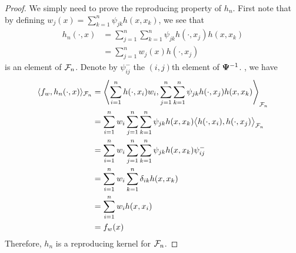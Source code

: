 \begin{proof}
  We simply need to prove the reproducing property of $h_n$.
  First note that by defining $w_j(x) = \sum_{k=1}^n \psi_{jk} h(x,x_k)$, we see that
  \begin{align*}
    h_n(\cdot,x) 
    &= \sum_{j=1}^n\sum_{k=1}^n \psi_{jk} h(\cdot,x_j) h(x,x_k) \\
    &= \sum_{j=1}^n w_j(x)h(\cdot,x_j)
  \end{align*}
  is an element of ${\mathcal F}_n$.
  Denote by $\psi_{ij}^{-}$ the $(i,j)$th element of ${\bm\Psi}^{-1}$.
  , we have
  \begin{align*}
    \langle f_w, h_n(\cdot,x)\rangle_{{\mathcal F}_n}
    &= \left\langle 
    \sum_{i=1}^n h(\cdot,x_i)w_i ,
    \sum_{j=1}^n\sum_{k=1}^n \psi_{jk} h(\cdot,x_j) h(x,x_k)
    \right\rangle_{{\mathcal F}_n} \\
    &= \sum_{i=1}^n w_i \sum_{j=1}^n\sum_{k=1}^n \psi_{jk}h(x,x_k) 
    \big\langle h(\cdot,x_i) , h(\cdot,x_j) \big\rangle_{{\mathcal F}_n} \\
    &= \sum_{i=1}^n w_i \sum_{j=1}^n\sum_{k=1}^n \psi_{jk}h(x,x_k)\psi_{ij}^{-} \\
    &= \sum_{i=1}^n w_i \sum_{k=1}^n \delta_{ik}h(x,x_k) \\
    &= \sum_{i=1}^n w_i h(x,x_i) \\
    &= f_w(x)
  \end{align*}
  Therefore, $h_n$ is a reproducing kernel for ${\mathcal F}_n$.
\end{proof}


